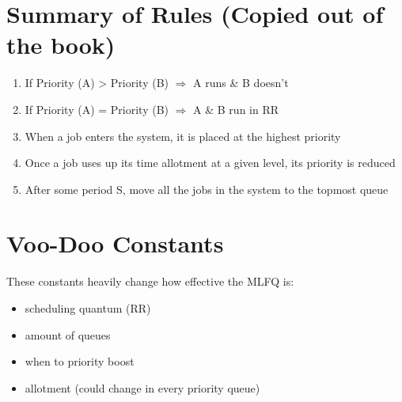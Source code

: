 \documentclass[11pt]{report}
\begin{document}
\section{Summary of Rules (Copied out of the book)}
\label{sec:orga6a11c6}
\begin{enumerate}
\item If Priority (A) > Priority (B) \(\Rightarrow\) A runs \& B doesn't
\item If Priority (A) = Priority (B) \(\Rightarrow\) A \& B run in RR
\item When a job enters the system, it is placed at the highest priority
\item Once a job uses up its time allotment at a given level, its priority is reduced
\item After some period S, move all the jobs in the system to the topmost queue
\end{enumerate}
\section{Voo-Doo Constants}
\label{sec:org578a8d8}
These constants heavily change how effective the MLFQ is:
\begin{itemize}
\item scheduling quantum (RR)
\item amount of queues
\item when to priority boost
\item allotment (could change in every priority queue)
\end{itemize}
\end{document}
